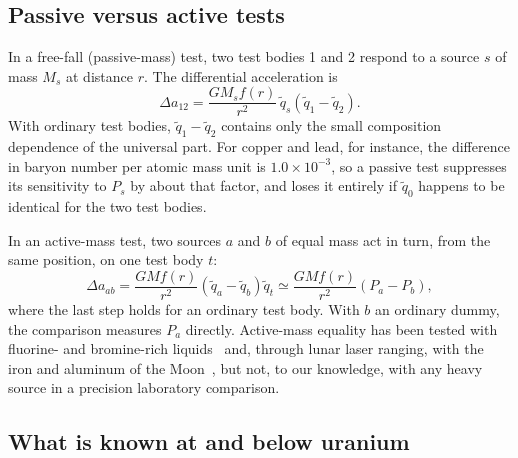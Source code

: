 \documentclass[aps,prd,onecolumn,superscriptaddress,floatfix,nofootinbib]{revtex4-2}
\newcommand{\qt}{\tilde q}
\begin{document}
\subsection{Passive versus active tests}

In a free-fall (passive-mass) test, two test bodies 1 and 2 respond to a source $s$ of mass $M_s$ at distance $r$.
The differential acceleration is
\begin{equation}
\Delta a_{12} = \frac{G M_s f(r)}{r^2}\,\qt_s\left(\qt_1-\qt_2\right).
\label{eq:passive}
\end{equation}
With ordinary test bodies, $\qt_1-\qt_2$ contains only the small composition dependence of the universal part. For
copper and lead, for instance, the difference in baryon number per atomic mass unit is $1.0\times10^{-3}$, so a
passive test suppresses its sensitivity to $P_s$ by about that factor, and loses it entirely if $\qt_0$ happens to be
identical for the two test bodies.

In an active-mass test, two sources $a$ and $b$ of equal mass act in turn, from the same position, on one test
body $t$:
\begin{equation}
\Delta a_{ab} = \frac{G M f(r)}{r^2}\left(\qt_a-\qt_b\right)\qt_t
\simeq \frac{G M f(r)}{r^2}\left(P_a-P_b\right),
\label{eq:active}
\end{equation}
where the last step holds for an ordinary test body. With $b$ an ordinary dummy, the comparison measures $P_a$
directly. Active-mass equality has been tested with fluorine- and bromine-rich liquids~\cite{Kreuzer1968} and,
through lunar laser ranging, with the iron and aluminum of the Moon~\cite{Bartlett1986}, but not, to our
knowledge, with any heavy source in a precision laboratory comparison.

\subsection{What is known at and below uranium}\label{sec:known}
\end{document}
